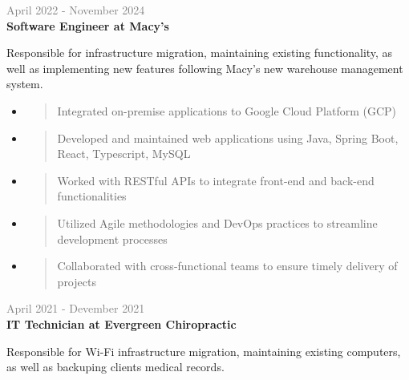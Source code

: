 \documentclass[letterpage]{article}
\begin{document}
\begin{minipage}[t]{0.61\linewidth}
\vspace{7px}
\textcolor{gray}{April 2022 - November 2024}\\
\textbf{\textsf{Software Engineer at Macy's}}\\
\raggedright
Responsible for infrastructure migration, maintaining existing functionality, as
well as implementing new features following Macy's new warehouse management system.
\begin{itemize}[leftmargin=*,labelindent=1mm,labelsep=0mm]
\item
  \begin{quote}
  \raggedright
  Integrated on-premise applications to Google Cloud Platform (GCP)
  \end{quote}
\item
  \begin{quote}
  \raggedright
  Developed and maintained web applications using Java, Spring Boot, React, Typescript, MySQL
  \end{quote}
\item
  \begin{quote}
  \raggedright
  Worked with RESTful APIs to integrate front-end and back-end functionalities
  \end{quote}
\item
  \begin{quote}
  \raggedright
  Utilized Agile methodologies and DevOps practices to streamline development processes
  \end{quote}
\item
  \begin{quote}
  \raggedright
  Collaborated with cross-functional teams to ensure timely delivery of projects
  \end{quote}
\end{itemize}

\vspace{7px}
\textcolor{gray}{April 2021 - Devember 2021}\\
\textbf{\textsf{IT Technician at Evergreen Chiropractic}}\\
\raggedright
Responsible for Wi-Fi infrastructure migration,
maintaining existing computers, as well as backuping clients medical records.


\end{minipage}
\end{document}
